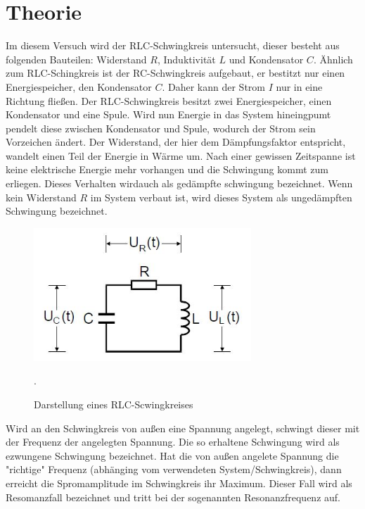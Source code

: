 \section{Theorie}
Im diesem Versuch wird der RLC-Schwingkreis untersucht, dieser besteht aus folgenden
Bauteilen: Widerstand $R$, Induktivität $L$ und Kondensator $C$.
Ähnlich zum RLC-Schingkreis ist der RC-Schwingkreis aufgebaut, er bestitzt nur einen
Energiespeicher, den Kondensator $C$. Daher kann der Strom $I$ nur in eine Richtung fließen.
Der RLC-Schwingkreis besitzt zwei Energiespeicher, einen Kondensator und eine
Spule. Wird nun Energie in das System hineingpumt pendelt diese zwischen Kondensator und
Spule, wodurch der Strom sein Vorzeichen ändert. Der Widerstand, der hier dem
Dämpfungsfaktor entspricht, wandelt einen Teil der Energie in Wärme um. Nach einer
gewissen Zeitspanne ist keine elektrische Energie mehr vorhangen und die Schwingung
kommt zum erliegen. Dieses Verhalten wirdauch als gedämpfte schwingung bezeichnet.
Wenn kein Widerstand $R$ im System verbaut ist, wird dieses System als
ungedämpften Schwingung bezeichnet.
\begin{figure}[H]
  \centering
  \includegraphics[height=5cm]{RLC.JPG}
  \caption{Darstellung eines RLC-Scwingkreises}
  \cite{skript}.
  \label{fig:RLC}
\end{figure}
Wird an den Schwingkreis von außen eine Spannung angelegt, schwingt dieser
mit der Frequenz der angelegten Spannung. Die so erhaltene Schwingung wird als
ezwungene Schwingung bezeichnet. Hat die von außen angelete Spannung die "richtige"
Frequenz (abhänging vom verwendeten System/Schwingkreis), dann erreicht die Spromamplitude im
Schwingkreis ihr Maximum. Dieser Fall wird als Resomanzfall bezeichnet und tritt bei der
sogenannten Resonanzfrequenz auf.

